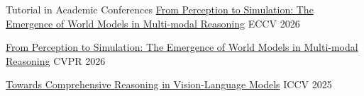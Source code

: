 \begin{rSection}{Tutorial in Academic Conferences}
\href{https://wangywust.github.io/eccv-tutorial-world-model/}{From Perception to Simulation: The Emergence of World Models in Multi-modal Reasoning} \hfill {ECCV 2026}

\href{https://wangywust.github.io/cvpr-tutorial-world-model/}{From Perception to Simulation: The Emergence of World Models in Multi-modal Reasoning} \hfill {CVPR 2026}

\href{https://wangywust.github.io/iccv-tutorial-reasoning-vlm/}{Towards Comprehensive Reasoning in Vision-Language Models} \hfill {ICCV 2025}

\end{rSection}
